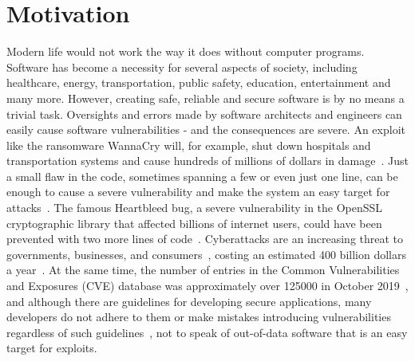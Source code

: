 \documentclass[
a4paper,
pagesize,
pdftex,
12pt,
ngerman,
fleqn,
final,
]{scrartcl}
\begin{document}
	
	\setcounter{secnumdepth}{5} %
	
	\newpage
	\section{Motivation}\label{Motivation}
	Modern life would not work the way it does without computer programs. Software has become a necessity for several aspects of society, including healthcare, energy, transportation, public safety, education, entertainment and many more. However, creating safe, reliable and secure software is by no means a trivial task. Oversights and errors made by software architects and engineers can easily cause software vulnerabilities - and the consequences are severe. An exploit like the ransomware WannaCry will, for example, shut down hospitals and transportation systems and cause hundreds of millions of dollars in damage~\cite{DanGoodin.2017}. Just a small flaw in the code, sometimes spanning a few or even just one line, can be enough to cause a severe vulnerability and make the system an easy target for attacks~\cite{Yamaguchi.2012}. The famous Heartbleed bug, a severe vulnerability in the OpenSSL cryptographic library that affected billions of internet users, could have been prevented with two more lines of code~\cite{Durumeric.2014}. Cyberattacks are an increasing threat to governments, businesses, and consumers~\cite{Dam.2017}, costing an estimated 400 billion dollars a year~\cite{Losses.2014}. At the same time, the number of entries in the Common Vulnerabilities and Exposures (CVE) database was approximately over 125000 in October 2019~\cite{CVE}, and although there are guidelines for developing secure applications, many developers do not adhere to them or make mistakes introducing vulnerabilities regardless of such guidelines~\cite{Gupta.2014}, not to speak of out-of-data software that is an easy target for exploits.\\
	
\end{document}
